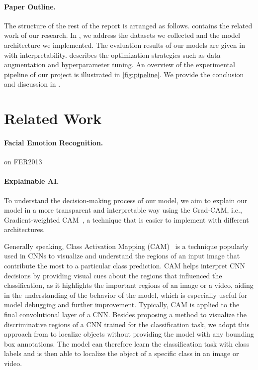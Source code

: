\paragraph{Paper Outline.}
The structure of the rest of the report is arranged as follows. 
 contains the related work of our research. 
In , 
we address the datasets we collected and the model architecture we implemented. 
The evaluation results of our models are given in  with interpretability. 
 describes the optimization strategies such as data augmentation and hyperparameter tuning. 
An overview of the experimental pipeline of our project is illustrated in \cref{fig:pipeline}. 
We provide the conclusion and discussion in . 

\section{Related Work}
\label{sec:related}

\paragraph{Facial Emotion Recognition.}
\citet{PhamVT20} on FER2013

\paragraph{Explainable AI.}
To understand the decision-making process of our model, 
we aim to explain our model in a more transparent and interpretable way using the Grad-CAM, 
i.e., Gradient-weighted CAM~\cite{SelvarajuCDVPB17}, 
a technique that is easier to implement with different architectures. 

Generally speaking, 
Class Activation Mapping (CAM)~\cite{ZhouKLOT16} is a technique popularly used in CNNs to visualize and understand the regions of an input image that contribute the most to a particular class prediction. 
CAM helps interpret CNN decisions by providing visual cues about the regions that influenced the classification, 
as it highlights the important regions of an image or a video, 
aiding in the understanding of the behavior of the model, 
which is especially useful for model debugging and further improvement. 
Typically,
CAM is applied to the final convolutional layer of a CNN. 
Besides proposing a method to visualize the discriminative regions of a CNN trained for the classification task, 
we adopt this approach from \citet{ZhouKLOT16} to localize objects without providing the model with any bounding box annotations. 
The model can therefore learn the classification task with class labels and is then able to localize the object of a specific class in an image or video. 

